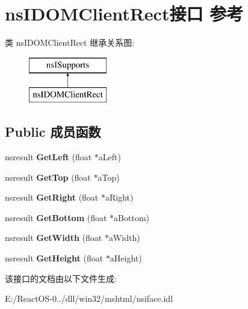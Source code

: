 \hypertarget{interfacens_i_d_o_m_client_rect}{}\section{ns\+I\+D\+O\+M\+Client\+Rect接口 参考}
\label{interfacens_i_d_o_m_client_rect}
类 ns\+I\+D\+O\+M\+Client\+Rect 继承关系图\+:\begin{figure}[H]
\begin{center}
\leavevmode
\includegraphics[height=2.000000cm]{interfacens_i_d_o_m_client_rect}
\end{center}
\end{figure}
\subsection*{Public 成员函数}
\begin{DoxyCompactItemize}
\item 
\mbox{\label{interfacens_i_d_o_m_client_rect_a0d280750f272646e8831af1fa010f988}} 
nsresult {\bfseries Get\+Left} (float $\ast$a\+Left)
\item 
\mbox{\label{interfacens_i_d_o_m_client_rect_af7336a322f332b711403081e43916855}} 
nsresult {\bfseries Get\+Top} (float $\ast$a\+Top)
\item 
\mbox{\label{interfacens_i_d_o_m_client_rect_af23517fcce10df715b22976e6ff89c9d}} 
nsresult {\bfseries Get\+Right} (float $\ast$a\+Right)
\item 
\mbox{\label{interfacens_i_d_o_m_client_rect_a3f2f739db3a6f0e6cb893619c8cc96cb}} 
nsresult {\bfseries Get\+Bottom} (float $\ast$a\+Bottom)
\item 
\mbox{\label{interfacens_i_d_o_m_client_rect_aa8569ff2e1764bdb000096074b9bdff5}} 
nsresult {\bfseries Get\+Width} (float $\ast$a\+Width)
\item 
\mbox{\label{interfacens_i_d_o_m_client_rect_af8ba544967cbb102b364e11fc7ffd0d6}} 
nsresult {\bfseries Get\+Height} (float $\ast$a\+Height)
\end{DoxyCompactItemize}


该接口的文档由以下文件生成\+:\begin{DoxyCompactItemize}
\item 
E\+:/\+React\+O\+S-\/0../dll/win32/mshtml/nsiface.\+idl\end{DoxyCompactItemize}
